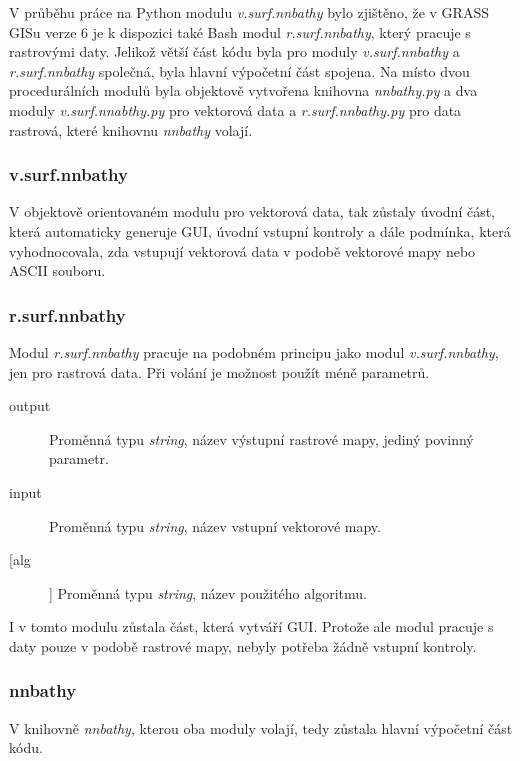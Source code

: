 \documentclass[12pt,a4paper]{article}
\begin{document}
{V průběhu práce na Python modulu \emph{v.surf.nnbathy} bylo
zjištěno, že v GRASS GISu verze 6 je k dispozici také Bash modul
\emph{r.surf.nnbathy}, který pracuje s rastrovými daty. Jelikož větší
část kódu byla pro moduly \emph{v.surf.nnbathy} a \emph{r.surf.nnbathy} společná,
byla hlavní výpočetní část spojena. Na místo dvou procedurálních
modulů byla objektově vytvořena knihovna \emph{nnbathy.py} a dva
moduly \emph{v.surf.nnabthy.py} pro vektorová data a
\emph{r.surf.nnbathy.py} pro data rastrová, které knihovnu
\emph{nnbathy} volají.

\subsubsection{v.surf.nnbathy}

V objektově orientovaném modulu pro vektorová data, tak zůstaly úvodní
část, která automaticky generuje GUI, úvodní vstupní kontroly a dále
podmínka, která vyhodnocovala, zda vstupují vektorová data v podobě
vektorové mapy nebo ASCII souboru.

\subsubsection{r.surf.nnbathy}

Modul \emph{r.surf.nnbathy} pracuje na podobném principu jako modul
\emph{v.surf.nnbathy}, jen pro rastrová data. Při volání je možnost
použít méně parametrů.
\begin{description}
\item[output] Proměnná typu \emph{string}, název výstupní rastrové mapy, jediný povinný parametr.
\item[input] Proměnná typu \emph{string}, název vstupní vektorové mapy.
\item[[alg]] Proměnná typu \emph{string}, název použitého algoritmu.
\end{description}


I v tomto modulu zůstala část, která vytváří GUI. Protože ale modul
pracuje s daty pouze v podobě rastrové mapy, nebyly potřeba žádně
vstupní kontroly.

\newpage
\subsubsection{nnbathy}

V knihovně {\em nnbathy}, kterou oba moduly volají, tedy zůstala hlavní
výpočetní část kódu.

}
\end{document}

